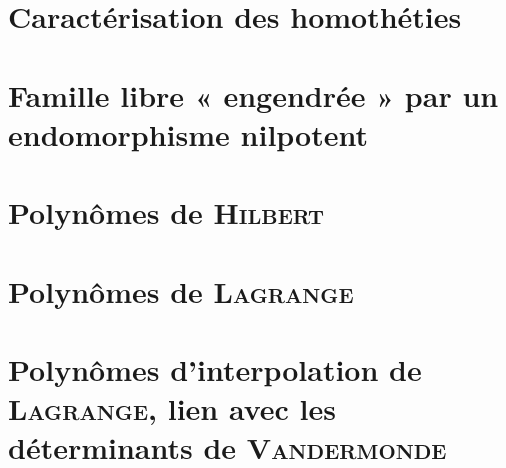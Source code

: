 \section{Caractérisation des homothéties}


\section{Famille libre « engendrée » par un endomorphisme nilpotent}


\section{Polynômes de \textsc{Hilbert}} \label{polynome_hilbert}


\section{Polynômes de \textsc{Lagrange}} 


\section{Polynômes d'interpolation de \textsc{Lagrange}, lien avec les déterminants de \textsc{Vandermonde}}
